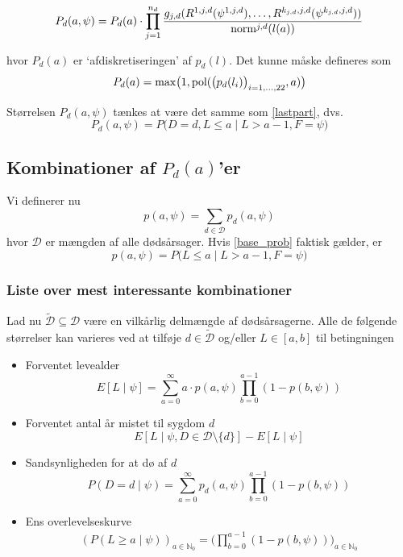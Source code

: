 \documentclass[a4paper, 12pt]{memoir}
\begin{document}
\begin{equation}
P_{d}(a,\psi)=P_{d}(a) \cdot \prod_{j=1}^{n_d} \frac{g_{j,d}(R^{1,j,d}(\psi^{1,j,d}),  \dots , R^{k_{j,d},j,d}(\psi^{k_{j,d},j,d}) )}{\textup{norm}^{j,d}(l(a))}\label{pda_calculation}
\end{equation}

hvor $P_d(a)$ er `afdiskretiseringen' af $p_d(l)$. Det kunne måske defineres som
\begin{equation*}
P_d(a)=\max\bigl(1,\textup{pol}(\bigl(p_d(l_i)\bigr)_{i=1, \dots, 22}, a)\bigr)
\end{equation*}

Størrelsen $P_d(a,\psi)$ tænkes at være det samme som \eqref{lastpart}, dvs.
\begin{equation}
P_d(a,\psi) =P\bigl(D=d, L\leq a \mid L>a-1, F=\psi\bigr)\label{base_prob}
\end{equation}

\subsection{Kombinationer af $P_d(a)$'er}

Vi definerer nu
\begin{equation*}
p(a,\psi)=\sum_{d\in \mathcal D}p_d(a,\psi)
\end{equation*}
hvor $\mathcal D$ er mængden af alle dødsårsager. Hvis \eqref{base_prob} faktisk gælder, er
\begin{equation*}
p(a,\psi)=P(L\leq a \mid L>a-1, F=\psi\bigr)
\end{equation*}


\subsubsection{Liste over mest interessante kombinationer}
Lad nu $\tilde{\mathcal D}  \subseteq \mathcal D$ være en vilkårlig delmængde af dødsårsagerne. Alle de følgende størrelser kan varieres ved at tilføje $d\in  \tilde{\mathcal D}$ og/eller $L\in [a,b]$ til betingningen
\begin{itemize}
\item
Forventet levealder
\begin{equation*}
E[L\mid \psi] = \sum_{a=0}^\infty a \cdot p(a, \psi)\prod_{b=0}^{a-1} (1-p(b,\psi))
\end{equation*}
\item
Forventet antal år mistet til sygdom $d$
\begin{equation*}
E[L\mid \psi, D\in \mathcal D\setminus \{d\}]-E[L\mid \psi]
\end{equation*}
\item
Sandsynligheden for at dø af $d$
\begin{equation*}
P(D=d\mid \psi)= \sum_{a=0}^\infty  p_d(a, \psi)\prod_{b=0}^{a-1} (1-p(b,\psi))
\end{equation*}
\item
Ens overlevelseskurve
\begin{align*}
(P(L\geq a \mid \psi))_{a\in \mathbb N_0} = \biggl(\prod_{b=0}^{a-1} (1-p(b,\psi))\biggr)_{a\in \mathbb N_0}
\end{align*}
\end{itemize}
\end{document}
